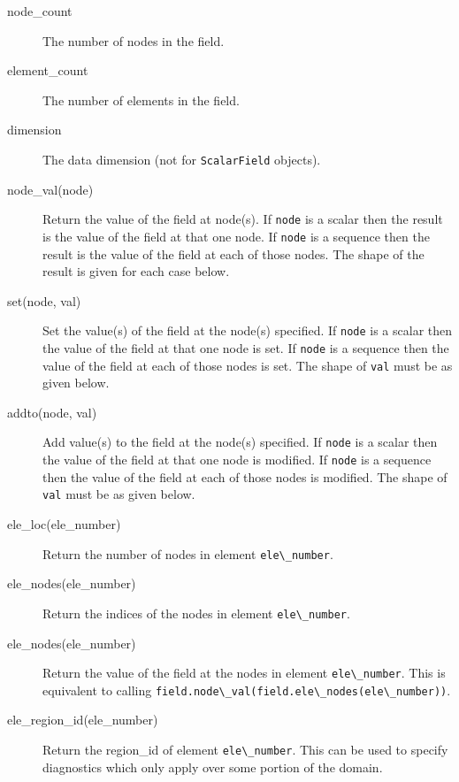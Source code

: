 \begin{description}
\item[node\_count] The number of nodes in the field.
\item[element\_count] The number of elements in the field.
\item[dimension] The data dimension (not for
  \lstinline[language=Python]+ScalarField+ objects).
\item[node\_val(node)] Return the value of the field at node(s). If
  \lstinline[language=Python]+node+ is a scalar then the result is the value
  of the field at that one node. If \lstinline[language=Python]+node+ is a
  sequence then the result is the value of the field at each of those
  nodes. The shape of the result is given for each case below.
\item[set(node, val)] Set the value(s) of the field at the node(s) specified. If
  \lstinline[language=Python]+node+ is a scalar then the value
  of the field at that one node is set. If \lstinline[language=Python]+node+ is a
  sequence then the value of the field at each of those nodes is set. The
  shape of \lstinline[language=Python]+val+ must be as given below.
\item[addto(node, val)] Add value(s) to the field at the node(s) specified.
  If \lstinline[language=Python]+node+ is a scalar then the value of the
  field at that one node is modified. If \lstinline[language=Python]+node+
  is a sequence then the value of the field at each of those nodes is
  modified. The shape of \lstinline[language=Python]+val+ must be as given
  below.
\item[ele\_loc(ele\_number)] Return the number of nodes in element
  \lstinline[language=Python]+ele\_number+.
\item[ele\_nodes(ele\_number)] Return the indices of the nodes in element
  \lstinline[language=Python]+ele\_number+. 
\item[ele\_nodes(ele\_number)] Return the value of the field at the nodes in element
  \lstinline[language=Python]+ele\_number+. This is equivalent to calling
  \lstinline[language=Python]+field.node\_val(field.ele\_nodes(ele\_number))+. 
\item[ele\_region\_id(ele\_number)] Return the region\_id of element
  \lstinline[language=Python]+ele\_number+. This can be used to specify
  diagnostics which only apply over some portion of the domain. 
\end{description}

